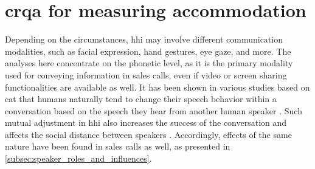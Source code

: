 \section[\Acl{crqa}]{\Acl{crqa} for measuring accommodation}
\label{sec:crqa}

Depending on the circumstances, \ac{hhi} may involve different communication modalities, such as facial expression, hand gestures, eye gaze, and more.
The analyses here concentrate on the phonetic level, as it is the primary modality used for conveying information in sales calls, even if video or screen sharing functionalities are available as well.
It has been shown in various studies based on \ac{cat} \citep[][and cf.\ \cref{sec:communication_accommodation_theory}]{Giles1991CAT, Gallois2015CAT} that humans naturally tend to change their speech behavior within a conversation based on the speech they hear from another human speaker \citep[see, e.g.][]{Bailly2010speech, Babel2014novelty}.
Such mutual adjustment in \ac{hhi} also increases the success of the conversation \citep{Pickering2004behavioral} and affects the social distance between speakers \citep{Schweitzer2017social}.
Accordingly, effects of the same nature have been found in sales calls as well, as presented in \cref{subsec:speaker_roles_and_influences}.


